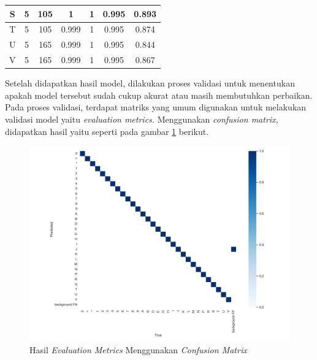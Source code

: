 \begin{center}
\begin{longtable}[c]{|c|c|c|c|c|c|c|}
    S              & 5                          & 105                   & 1          & 1          & 0.995            & 0.893                 \\ \hline
    T              & 5                          & 105                   & 0.999      & 1          & 0.995            & 0.874                 \\ \hline
    U              & 5                          & 165                   & 0.999      & 1          & 0.995            & 0.844                 \\ \hline
    V              & 5                          & 165                   & 0.999      & 1          & 0.995            & 0.867                 \\ \hline
  \end{longtable}
\end{center}

Setelah didapatkan hasil model, dilakukan proses validasi untuk menentukan apakah model tersebut sudah cukup akurat atau masih membutuhkan perbaikan. Pada proses validasi, terdapat matriks yang umum digunakan untuk melakukan validasi model yaitu \textit{evaluation metrics.} Menggunakan \textit{confusion matrix,} didapatkan hasil yaitu seperti pada gambar \ref*{fig:confusionmetrics} berikut.

\begin{figure}[H]
  \centering
  \includegraphics[scale=0.5]{gambar/confusion_matrix.png}
  \caption{Hasil \textit{Evaluation Metrics} Menggunakan \textit{Confusion Matrix}}
  \label{fig:confusionmetrics}
\end{figure}

